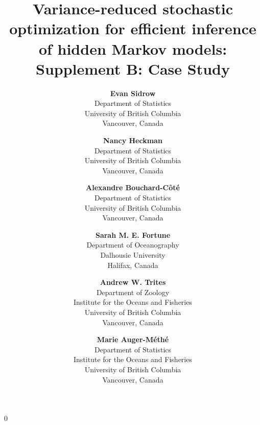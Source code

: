 \documentclass[12pt]{article}
\newcommand{\blind}{0}
\begin{document}
%

\def\spacingset#1{\renewcommand{\baselinestretch}%
{#1}\small\normalsize} \spacingset{1}


\blind
{
    \title{Variance-reduced stochastic optimization for efficient inference of hidden Markov models: Supplement B: Case Study}

    \author{
      \textbf{Evan Sidrow} \\
      Department of Statistics \\
      University of British Columbia\\
      Vancouver, Canada \\
      \and
      \textbf{Nancy Heckman} \\
      Department of Statistics \\
      University of British Columbia \\
      Vancouver, Canada \\
      \and
      \textbf{Alexandre Bouchard-C\^ot\'e} \\
      Department of Statistics \\
      University of British Columbia \\
      Vancouver, Canada \\
      \and
      \textbf{Sarah M. E. Fortune} \\
      Department of Oceanography \\
      Dalhousie University \\
      Halifax, Canada \\
      \and
      \textbf{Andrew W. Trites} \\
      Department of Zoology \\
      Institute for the Oceans and Fisheries \\
      University of British Columbia \\
      Vancouver, Canada \\
      \and
      \textbf{Marie Auger-M\'eth\'e} \\
      Department of Statistics \\
      Institute for the Oceans and Fisheries \\
      University of British Columbia \\
      Vancouver, Canada \\
    }
    \maketitle
} \fi
\end{document}
